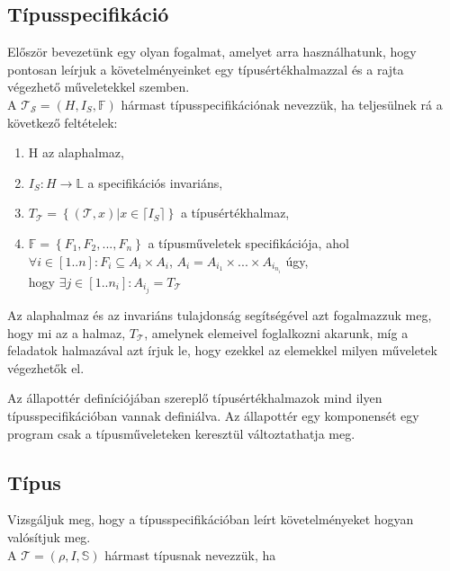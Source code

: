 \documentclass[margin=0px]{article}
\begin{document}
\subsection{Típusspecifikáció}

Először bevezetünk egy olyan fogalmat, amelyet arra használhatunk, hogy pontosan
leírjuk a követelményeinket egy típusértékhalmazzal és a rajta végezhető
műveletekkel szemben.\\

\noindent A $\mathcal{T_{S}}=(H,I_{S},\mathbb{F})$ hármast típusspecifikációnak nevezzük, ha
teljesülnek rá a következő feltételek:

\begin{enumerate}
    \item H az alaphalmaz,

    \item $I_{S} : H \to \mathbb{L} $ a specifikációs invariáns,

    \item $T_{\mathcal{T}} = \left\{ {(\mathcal{T},x) | x \in \lceil I_{S}} \rceil\right\}$ a típusértékhalmaz,

    \item $\mathbb{F} = \left\{ {F_{1},F_{2},...,F_{n}}\right\}$ a típusműveletek specifikációja, ahol\\
          $\forall i \in [1..n]: F_{i} \subseteq A_{i} \times A_{i}$, $A_{i} = A_{i_{1}} \times ... \times A_{i_{n_{i}}}$ úgy,\\
          hogy $\exists j \in [1..n_{i}]: A_{i_{j}} = T_{\mathcal{T}} $
\end{enumerate}

Az alaphalmaz és az invariáns tulajdonság segítségével azt fogalmazzuk meg,
hogy mi az a halmaz, $T_{\mathcal{T}}$, amelynek elemeivel foglalkozni akarunk, míg a feladatok
halmazával azt írjuk le, hogy ezekkel az elemekkel milyen műveletek végezhetők
el.

Az állapottér definíciójában szereplő típusértékhalmazok mind ilyen típusspecifikációban
vannak definiálva. Az állapottér egy komponensét egy program csak a típusműveleteken keresztül változtathatja meg.
\subsection{Típus}

Vizsgáljuk meg, hogy a típusspecifikációban leírt követelményeket hogyan valósítjuk
meg.\\

\noindent A $\mathcal{T}=(\rho,I,\mathbb{S})$ hármast típusnak nevezzük, ha
\end{document}
